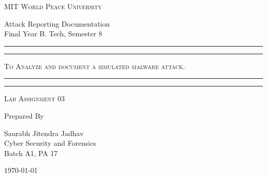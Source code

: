 \documentclass[11pt]{article}
\begin{document}
\begin{titlepage}
    \centering


    \huge\textsc{
        MIT World Peace University
    }\\

    \vspace{0.75\baselineskip} %

    \LARGE{
        Attack Reporting Documentation\\
        Final Year B. Tech, Semester 8
    }

    \vfill %


     \rule{\textwidth}{1.6pt}\vspace*{-\baselineskip}\vspace*{2pt}
     \rule{\textwidth}{0.6pt}



 
    \huge{\textsc{
        To Analyze and document a simulated malware attack.
        }} \\



     \rule{\textwidth}{0.6pt}\vspace*{-\baselineskip}\vspace*{2.8pt}
     \rule{\textwidth}{1.6pt}

    \vspace{1\baselineskip} %


    \LARGE\textsc{
       Lab Assignment 03
    } %
    \vfill


    Prepared By
    \vspace{0.5\baselineskip} %

    \Large{
       Saurabh Jitendra Jadhav \\
        Cyber Security and Forensics\\
        Batch A1, PA 17
    }


    \vspace{0.5\baselineskip} %
    \today

\end{titlepage}
\end{document}
